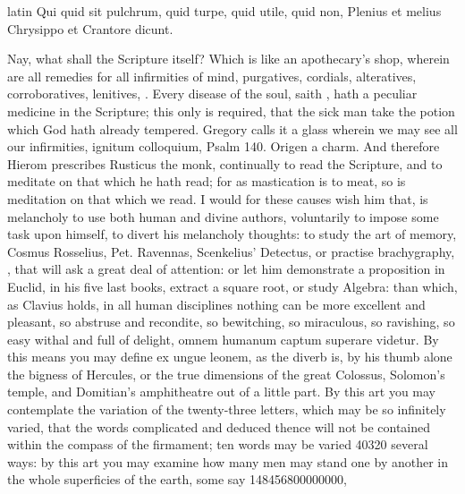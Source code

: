 {\begin{foreigndisplayquote}{latin}%
Qui quid sit pulchrum, quid turpe, quid utile, quid non,
Plenius et melius Chrysippo et Crantore dicunt.
\end{foreigndisplayquote}%
\translationrule%
\begin{quote}%
\end{quote}%
%
Nay, what shall the Scripture itself? Which is like an apothecary's
shop, wherein are all remedies for all infirmities of mind, purgatives,
cordials, alteratives, corroboratives, lenitives, \etc{}. Every disease of
the soul, saith \Austin{}, hath a peculiar medicine in the
Scripture; this only is required, that the sick man take the potion
which God hath already tempered. Gregory calls it a glass wherein
we may see all our infirmities, ignitum colloquium, Psalm  140.
Origen a charm. And therefore Hierom prescribes Rusticus the
monk, continually to read the Scripture, and to meditate on that
which he hath read; for as mastication is to meat, so is meditation on
that which we read. I would for these causes wish him that, is
melancholy to use both human and divine authors, voluntarily to impose
some task upon himself, to divert his melancholy thoughts: to study the
art of memory, Cosmus Rosselius, Pet. Ravennas, Scenkelius' Detectus,
or practise brachygraphy, \etc{}, that will ask a great deal of attention:
or let him demonstrate a proposition in Euclid, in his five last books,
extract a square root, or study Algebra: than which, as Clavius
holds, in all human disciplines nothing can be more excellent and
pleasant, so abstruse and recondite, so bewitching, so miraculous, so
ravishing, so easy withal and full of delight, omnem humanum captum
superare videtur. By this means you may define ex ungue leonem, as the
diverb is, by his thumb alone the bigness of Hercules, or the true
dimensions of the great Colossus, Solomon's temple, and
Domitian's amphitheatre out of a little part. By this art you may
contemplate the variation of the twenty-three letters, which may be so
infinitely varied, that the words complicated and deduced thence will
not be contained within the compass of the firmament; ten words may be
varied 40\thinspace{}320 several ways: by this art you may examine how many men
may stand one by another in the whole superficies of the earth, some
say 148\thinspace{}456\thinspace{}800\thinspace{}000\thinspace{}000, 
}
